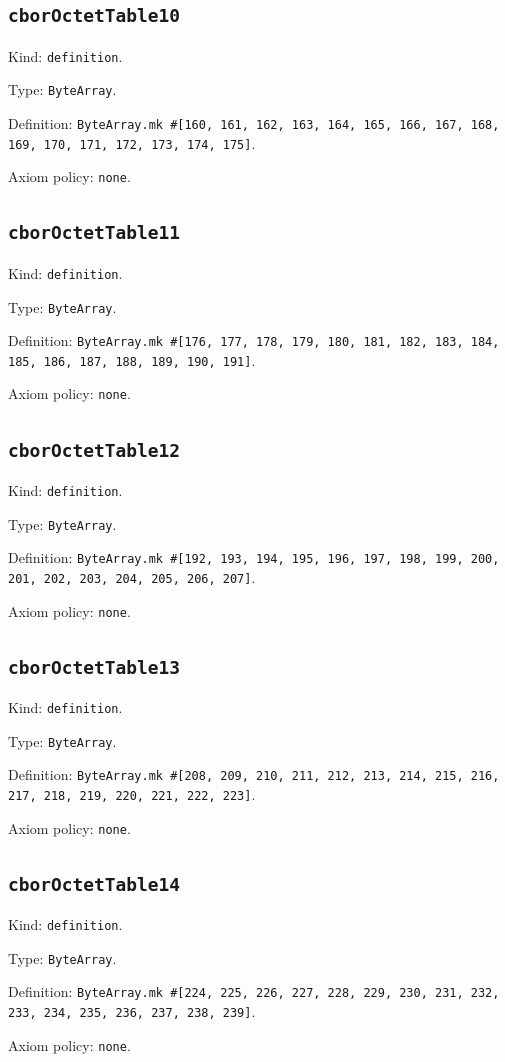 \documentclass[11pt]{article}
\begin{document}
\subsection*{\texttt{cborOctetTable10}}
\noindent Kind: \texttt{definition}.\par
\noindent Type: \texttt{ByteArray}.\par
\noindent Definition: \texttt{ByteArray.mk \#[160, 161, 162, 163, 164, 165, 166, 167, 168, 169, 170, 171, 172, 173, 174, 175]}.\par
\noindent Axiom policy: \texttt{none}.\par
\subsection*{\texttt{cborOctetTable11}}
\noindent Kind: \texttt{definition}.\par
\noindent Type: \texttt{ByteArray}.\par
\noindent Definition: \texttt{ByteArray.mk \#[176, 177, 178, 179, 180, 181, 182, 183, 184, 185, 186, 187, 188, 189, 190, 191]}.\par
\noindent Axiom policy: \texttt{none}.\par
\subsection*{\texttt{cborOctetTable12}}
\noindent Kind: \texttt{definition}.\par
\noindent Type: \texttt{ByteArray}.\par
\noindent Definition: \texttt{ByteArray.mk \#[192, 193, 194, 195, 196, 197, 198, 199, 200, 201, 202, 203, 204, 205, 206, 207]}.\par
\noindent Axiom policy: \texttt{none}.\par
\subsection*{\texttt{cborOctetTable13}}
\noindent Kind: \texttt{definition}.\par
\noindent Type: \texttt{ByteArray}.\par
\noindent Definition: \texttt{ByteArray.mk \#[208, 209, 210, 211, 212, 213, 214, 215, 216, 217, 218, 219, 220, 221, 222, 223]}.\par
\noindent Axiom policy: \texttt{none}.\par
\subsection*{\texttt{cborOctetTable14}}
\noindent Kind: \texttt{definition}.\par
\noindent Type: \texttt{ByteArray}.\par
\noindent Definition: \texttt{ByteArray.mk \#[224, 225, 226, 227, 228, 229, 230, 231, 232, 233, 234, 235, 236, 237, 238, 239]}.\par
\noindent Axiom policy: \texttt{none}.\par
\end{document}

